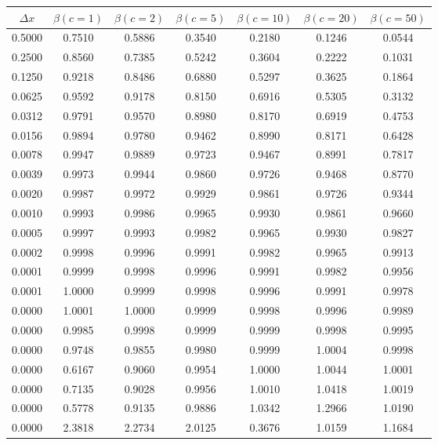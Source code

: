 \begin{tabular}{|c|c|c|c|c|c|c|}
\hline
\textbf{$\Delta x$}&\textbf{$\beta(c=1)$}&\textbf{$\beta(c=2)$}&\textbf{$\beta(c=5)$}&\textbf{$\beta(c=10)$}&\textbf{$\beta(c=20)$}&\textbf{$\beta(c=50)$}\\\hline
0.5000&0.7510&0.5886&0.3540&0.2180&0.1246&0.0544\\\hline
0.2500&0.8560&0.7385&0.5242&0.3604&0.2222&0.1031\\\hline
0.1250&0.9218&0.8486&0.6880&0.5297&0.3625&0.1864\\\hline
0.0625&0.9592&0.9178&0.8150&0.6916&0.5305&0.3132\\\hline
0.0312&0.9791&0.9570&0.8980&0.8170&0.6919&0.4753\\\hline
0.0156&0.9894&0.9780&0.9462&0.8990&0.8171&0.6428\\\hline
0.0078&0.9947&0.9889&0.9723&0.9467&0.8991&0.7817\\\hline
0.0039&0.9973&0.9944&0.9860&0.9726&0.9468&0.8770\\\hline
0.0020&0.9987&0.9972&0.9929&0.9861&0.9726&0.9344\\\hline
0.0010&0.9993&0.9986&0.9965&0.9930&0.9861&0.9660\\\hline
0.0005&0.9997&0.9993&0.9982&0.9965&0.9930&0.9827\\\hline
0.0002&0.9998&0.9996&0.9991&0.9982&0.9965&0.9913\\\hline
0.0001&0.9999&0.9998&0.9996&0.9991&0.9982&0.9956\\\hline
0.0001&1.0000&0.9999&0.9998&0.9996&0.9991&0.9978\\\hline
0.0000&1.0001&1.0000&0.9999&0.9998&0.9996&0.9989\\\hline
0.0000&0.9985&0.9998&0.9999&0.9999&0.9998&0.9995\\\hline
0.0000&0.9748&0.9855&0.9980&0.9999&1.0004&0.9998\\\hline
0.0000&0.6167&0.9060&0.9954&1.0000&1.0044&1.0001\\\hline
0.0000&0.7135&0.9028&0.9956&1.0010&1.0418&1.0019\\\hline
0.0000&0.5778&0.9135&0.9886&1.0342&1.2966&1.0190\\\hline
0.0000&2.3818&2.2734&2.0125&0.3676&1.0159&1.1684\\\hline
\end{tabular}
